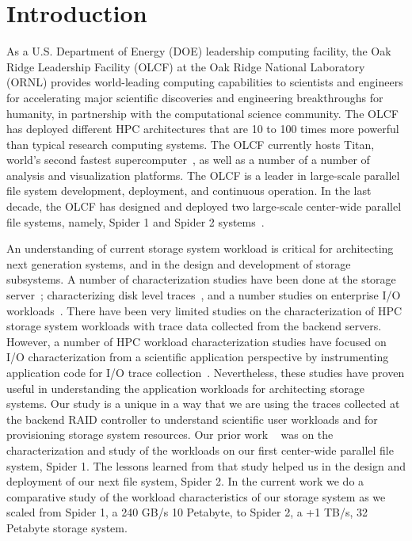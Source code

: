\section{Introduction}
\label{sec:intro}

As a U.S. Department of Energy (DOE) leadership computing facility, the Oak
Ridge Leadership Facility (OLCF) at the Oak Ridge National Laboratory (ORNL)
provides world-leading computing capabilities to scientists and engineers for
accelerating major scientific discoveries and engineering breakthroughs for
humanity, in partnership with the computational science community. The OLCF has
deployed different HPC architectures that are 10 to 100 times more powerful
than typical research computing systems. The OLCF currently hosts Titan,
world's second fastest supercomputer~\cite{titan}, as well as a number of a
number of analysis and visualization platforms. The OLCF is a leader in large-scale
parallel file system development, deployment, and continuous operation. In the
last decade, the OLCF has designed and deployed two large-scale center-wide
parallel file systems, namely, Spider 1 and Spider 2 systems~\cite{spider1,
spider2}.

An understanding of current storage system workload is critical for
architecting next generation systems, and in the design and development of
storage subsystems. A number of characterization studies have been done at the
storage server~\cite{hpca04:zhang, iiswc08:swaroop}; characterizing disk level
traces~\cite{ sigmetrics09:alma}, and a number studies on enterprise I/O
workloads~\cite{gmach2007workload, hpca04:zhang}. There have been very limited
studies on the characterization of HPC storage system workloads with trace data
collected from the backend servers. However, a number of HPC workload
characterization studies have focused on I/O characterization from a scientific
application perspective by instrumenting application code for I/O trace
collection~\cite{ iasds09:philip, shan2008characterizing}. Nevertheless, these
studies have proven useful in understanding the application workloads for
architecting storage systems. Our study is a unique in a way that we are using
the traces collected at the backend RAID controller to understand scientific
user workloads and for provisioning storage system resources. Our prior work
~\cite{ spider1-workload} was on the characterization and study of the
workloads on our first center-wide parallel file system, Spider 1. The lessons
learned from that study helped us in the design and deployment of our next file
system, Spider 2. In the current work we do a comparative study of the workload
characteristics of our storage system as we scaled from Spider 1, a 240 GB/s
10 Petabyte, to Spider 2, a +1 TB/s, 32 Petabyte storage system.

